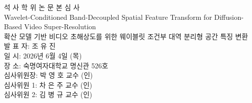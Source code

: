 \documentclass{article}
\begin{document}
\begin{center}
\Large 석 사 학 위 논 문 본 심 사\\
\vspace*{2cm}
\fontsize {20pt}{24pt}
Wavelet-Conditioned Band-Decoupled Spatial Feature Transform 
       for Diffusion-Based Video Super-Resolution\\
\vspace*{1cm}
\fontsize {16pt}{19pt}
확산 모델 기반 비디오 초해상도를 위한 웨이블릿 조건부 
         대역 분리형 공간 특징 변환\\

\vspace*{2cm}
\Large
발  표  자:    조 유 진\\
\vspace*{5mm}
일      시: 2026년 6월 4일 (목)\\
\vspace*{5mm}
장      소: 숙명여자대학교 명신관 526호\\
\vspace*{2cm}
심사위원장: 박 영 호 교수 (인) \\
\vspace*{5mm}
심사위원 1: 차 은 주 교수 (인) \\
\vspace*{5mm}
심사위원 2: 김 병 규 교수 (인) \\
\end{center}
\end{document}
